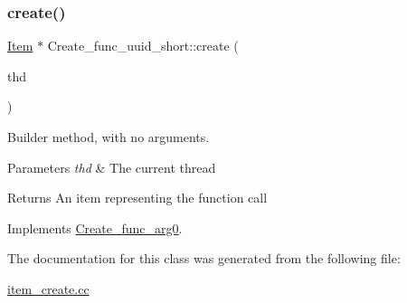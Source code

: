 \subsubsection{\texorpdfstring{create()}{create()}}
{\footnotesize\ttfamily \mbox{\hyperlink{classItem}{Item}} $\ast$ Create\+\_\+func\+\_\+uuid\+\_\+short\+::create (\begin{DoxyParamCaption}\item[{T\+HD $\ast$}]{thd }\end{DoxyParamCaption})\hspace{0.3cm}{\ttfamily [virtual]}}

Builder method, with no arguments. 
\begin{DoxyParams}{Parameters}
{\em thd} & The current thread \\
\hline
\end{DoxyParams}
\begin{DoxyReturn}{Returns}
An item representing the function call 
\end{DoxyReturn}


Implements \mbox{\hyperlink{classCreate__func__arg0_abb65b43817f9382759c79487228ee29f}{Create\+\_\+func\+\_\+arg0}}.



The documentation for this class was generated from the following file\+:\begin{DoxyCompactItemize}
\item 
\mbox{\hyperlink{item__create_8cc}{item\+\_\+create.\+cc}}\end{DoxyCompactItemize}
